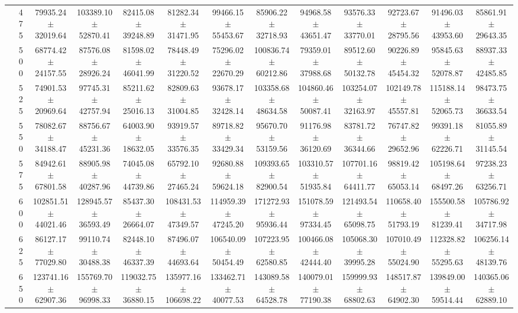 \begin{table}[h]
{\begin{tabular}{
        ccccccccccccc}
 & 475& 79935.24 $\pm$ 32019.64& 103389.10 $\pm$ 52870.41& 82415.08 $\pm$ 39248.89& 81282.34 $\pm$ 31471.95& 99466.15 $\pm$ 55453.67& 85906.22 $\pm$ 32718.93& 94968.58 $\pm$ 43651.47& 93576.33 $\pm$ 33770.01& 92723.67 $\pm$ 28795.56& 91496.03 $\pm$ 43953.60& 85861.91 $\pm$ 29643.35 \\ 
 & 500& 68774.42 $\pm$ 24157.55& 87576.08 $\pm$ 28926.24& 81598.02 $\pm$ 46041.99& 78448.49 $\pm$ 31220.52& 75296.02 $\pm$ 22670.29& 100836.74 $\pm$ 60212.86& 79359.01 $\pm$ 37988.68& 89512.60 $\pm$ 50132.78& 90226.89 $\pm$ 45454.32& 95845.63 $\pm$ 52078.87& 88937.33 $\pm$ 42485.85 \\ 
 & 525& 74901.53 $\pm$ 20969.64& 97745.31 $\pm$ 42757.94& 85211.62 $\pm$ 25016.13& 82809.63 $\pm$ 31004.85& 93678.17 $\pm$ 32428.14& 103358.68 $\pm$ 48634.58& 104860.46 $\pm$ 50087.41& 103254.07 $\pm$ 32163.97& 102149.78 $\pm$ 45557.81& 115188.14 $\pm$ 52065.73& 98473.75 $\pm$ 36633.54 \\ 
 & 550& 78082.67 $\pm$ 34188.47& 88756.67 $\pm$ 45231.36& 64003.90 $\pm$ 18632.05& 93919.57 $\pm$ 33576.35& 89718.82 $\pm$ 33429.34& 95670.70 $\pm$ 53159.56& 91176.98 $\pm$ 36120.69& 83781.72 $\pm$ 36344.66& 76747.82 $\pm$ 29652.96& 99391.18 $\pm$ 62226.71& 81055.89 $\pm$ 31145.54 \\ 
 & 575& 84942.61 $\pm$ 67801.58& 88905.98 $\pm$ 40287.96& 74045.08 $\pm$ 44739.86& 65792.10 $\pm$ 27465.24& 92680.88 $\pm$ 59624.18& 109393.65 $\pm$ 82900.54& 103310.57 $\pm$ 51935.84& 107701.16 $\pm$ 64411.77& 98819.42 $\pm$ 65053.14& 105198.64 $\pm$ 68497.26& 97238.23 $\pm$ 63256.71 \\ 
 & 600& 102851.51 $\pm$ 44021.46& 128945.57 $\pm$ 36593.49& 85437.30 $\pm$ 26664.07& 108431.53 $\pm$ 47349.57& 114959.39 $\pm$ 47245.20& 171272.93 $\pm$ 95936.44& 151078.59 $\pm$ 97334.45& 121493.54 $\pm$ 65098.75& 110658.40 $\pm$ 51793.19& 155500.58 $\pm$ 81239.41& 105786.92 $\pm$ 34717.98 \\ 
 & 625& 86127.17 $\pm$ 77029.80& 99110.74 $\pm$ 30488.38& 82448.10 $\pm$ 46337.39& 87496.07 $\pm$ 44693.64& 106540.09 $\pm$ 50454.49& 107223.95 $\pm$ 62580.85& 100466.08 $\pm$ 42444.40& 105068.30 $\pm$ 39995.28& 107010.49 $\pm$ 55024.90& 112328.82 $\pm$ 55295.63& 106256.14 $\pm$ 48139.76 \\ 
 & 650& 123741.16 $\pm$ 62907.36& 155769.70 $\pm$ 96998.33& 119032.75 $\pm$ 36880.15& 135977.16 $\pm$ 106698.22& 133462.71 $\pm$ 40077.53& 143089.58 $\pm$ 64528.78& 140079.01 $\pm$ 77190.38& 159999.93 $\pm$ 68802.63& 148517.87 $\pm$ 64902.30& 139849.00 $\pm$ 59514.44& 140365.06 $\pm$ 62889.10 \\ \hline 

\end{tabular}}
\end{table}
